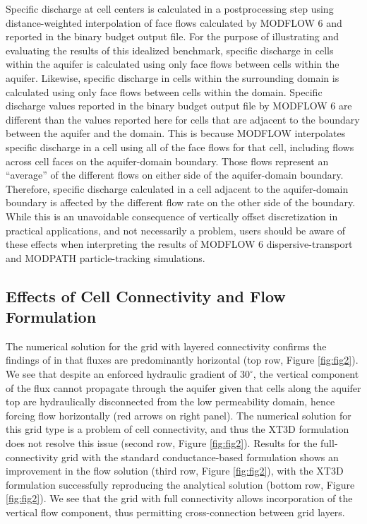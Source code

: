 \documentclass{article}
\begin{document}
Specific discharge at cell centers is calculated in a postprocessing step using distance-weighted interpolation of face flows calculated by MODFLOW 6 and reported in the binary budget output file. For the purpose of illustrating and evaluating the results of this idealized benchmark, specific discharge in cells within the aquifer is calculated using only face flows between cells within the aquifer. Likewise, specific discharge in cells within the surrounding domain is calculated using only face flows between cells within the domain. Specific discharge values reported in the binary budget output file by MODFLOW 6 are different than the values reported here for cells that are adjacent to the boundary between the aquifer and the domain. This is because MODFLOW interpolates specific discharge in a cell using all of the face flows for that cell, including flows across cell faces on the aquifer-domain boundary. Those flows represent an ``average'' of the different flows on either side of the aquifer-domain boundary. Therefore, specific discharge calculated in a cell adjacent to the aquifer-domain boundary is affected by the different flow rate on the other side of the boundary. While this is an unavoidable consequence of vertically offset discretization in practical applications, and not necessarily a problem, users should be aware of these effects when interpreting the results of MODFLOW 6 dispersive-transport and MODPATH particle-tracking simulations.

\subsection{Effects of Cell Connectivity and Flow Formulation}

The numerical solution for the grid with layered connectivity confirms the findings of \cite{bardot2022} in that fluxes are predominantly horizontal (top row, Figure \ref{fig:fig2}). We see that despite an enforced hydraulic gradient of $30^{\circ}$, the vertical component of the flux cannot propagate through the aquifer given that cells along the aquifer top are hydraulically disconnected from the low permeability domain, hence forcing flow horizontally (red arrows on right panel). The numerical solution for this grid type is a problem of cell connectivity, and thus the XT3D formulation does not resolve this issue (second row, Figure \ref{fig:fig2}). Results for the full-connectivity grid with the standard conductance-based formulation shows an improvement in the flow solution (third row, Figure \ref{fig:fig2}), with the XT3D formulation successfully reproducing the analytical solution (bottom row, Figure \ref{fig:fig2}). We see that the grid with full connectivity allows incorporation of the vertical flow component, thus permitting cross-connection between grid layers.
\end{document}
